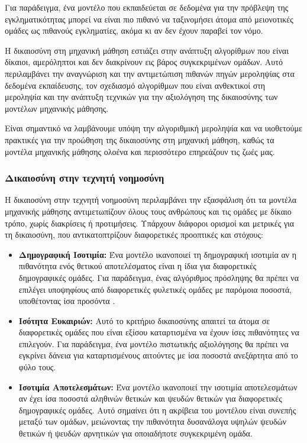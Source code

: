 \documentclass[12pt,twoside]{article}
\newcommand{\gr}{\selectlanguage{greek}}
\begin{document}
Για παράδειγμα, ένα μοντέλο που εκπαιδεύεται σε δεδομένα για την πρόβλεψη της εγκληματικότητας μπορεί να είναι πιο πιθανό να ταξινομήσει άτομα από μειονοτικές ομάδες ως πιθανούς εγκληματίες, ακόμα κι αν δεν έχουν παραβεί τον νόμο.

Η δικαιοσύνη στη μηχανική μάθηση εστιάζει στην ανάπτυξη αλγορίθμων που είναι δίκαιοι, αμερόληπτοι και δεν διακρίνουν εις βάρος συγκεκριμένων ομάδων. Αυτό περιλαμβάνει την αναγνώριση και την αντιμετώπιση πιθανών πηγών μεροληψίας στα δεδομένα εκπαίδευσης, τον σχεδιασμό αλγορίθμων που είναι ανθεκτικοί στη μεροληψία και την ανάπτυξη τεχνικών για την αξιολόγηση της δικαιοσύνης των μοντέλων μηχανικής μάθησης.

Είναι σημαντικό να λαμβάνουμε υπόψη την αλγοριθμική μεροληψία και να υιοθετούμε πρακτικές για την προώθηση της δικαιοσύνης στη μηχανική μάθηση, καθώς τα μοντέλα μηχανικής μάθησης ολοένα και περισσότερο επηρεάζουν τις ζωές μας.

\subsubsection{\gr Δικαιοσύνη στην τεχνητή νοημοσύνη}
\gr Η δικαιοσύνη στην τεχνητή νοημοσύνη περιλαμβάνει την εξασφάλιση ότι τα μοντέλα μηχανικής μάθησης αντιμετωπίζουν όλους τους ανθρώπους και τις ομάδες με δίκαιο τρόπο, χωρίς διακρίσεις ή προτιμήσεις. Υπάρχουν διάφοροι ορισμοί και μετρικές για τη δικαιοσύνη, που αντικατοπτρίζουν διαφορετικές προοπτικές και στόχους:

\begin{itemize}
    \item \textbf{\gr Δημογραφική Ισοτιμία:} \gr Ένα μοντέλο ικανοποιεί τη δημογραφική ισοτιμία αν η πιθανότητα ενός θετικού αποτελέσματος είναι η ίδια για διαφορετικές δημογραφικές ομάδες. Για παράδειγμα, ένας αλγόριθμος πρόσληψης θα πρέπει να επιλέγει υποψηφίους από διαφορετικές φυλετικές ομάδες με παρόμοια ποσοστά, υποθέτοντας ίσα προσόντα \citep{hardt2016equality}.
    \item \textbf{\gr Ισότητα Ευκαιριών:} \gr Αυτό το κριτήριο δικαιοσύνης απαιτεί τα άτομα σε διαφορετικές ομάδες που είναι εξίσου καταρτισμένα να έχουν ίσες πιθανότητες να επιλεγούν. Για παράδειγμα, ένα μοντέλο πιστωτικής αξιολόγησης θα πρέπει να εγκρίνει δάνεια για καταρτισμένους αιτούντες με ίσα ποσοστά ανεξάρτητα από το φύλο τους.
    \item \textbf{\gr Ισοτιμία Αποτελεσμάτων:} \gr Ένα μοντέλο ικανοποιεί την ισοτιμία αποτελεσμάτων αν έχει ίσα ποσοστά αληθινών θετικών και ψευδών θετικών για διαφορετικές δημογραφικές ομάδες. Αυτό σημαίνει ότι η ακρίβεια του μοντέλου είναι συνεπής μεταξύ των ομάδων, μειώνοντας την πιθανότητα δυσανάλογα υψηλών ψευδών θετικών ή ψευδών αρνητικών για οποιαδήποτε συγκεκριμένη ομάδα.
\end{itemize}
\end{document}
